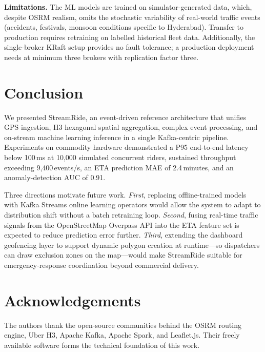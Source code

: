 \documentclass[conference]{IEEEtran}
\begin{document}
\textbf{Limitations.}
The ML models are trained on simulator-generated data, which, despite
OSRM realism, omits the stochastic variability of real-world traffic
events (accidents, festivals, monsoon conditions specific to Hyderabad).
Transfer to production requires retraining on labelled historical
fleet data. Additionally, the single-broker KRaft setup provides no
fault tolerance; a production deployment needs at minimum three brokers
with replication factor three.

\section{Conclusion}
\label{sec:conclusion}

We presented StreamRide, an event-driven reference architecture that
unifies GPS ingestion, H3 hexagonal spatial aggregation, complex event
processing, and on-stream machine learning inference in a single
Kafka-centric pipeline. Experiments on commodity hardware demonstrated
a P95 end-to-end latency below 100\,ms at 10,000 simulated concurrent
riders, sustained throughput exceeding 9,400\,events/s, an ETA
prediction MAE of 2.4\,minutes, and an anomaly-detection AUC of 0.91.

Three directions motivate future work. \textit{First}, replacing
offline-trained models with Kafka Streams online learning operators
would allow the system to adapt to distribution shift without a batch
retraining loop. \textit{Second}, fusing real-time traffic signals
from the OpenStreetMap Overpass API into the ETA feature set is
expected to reduce prediction error further. \textit{Third}, extending
the dashboard geofencing layer to support dynamic polygon creation at
runtime—so dispatchers can draw exclusion zones on the map—would
make StreamRide suitable for emergency-response coordination beyond
commercial delivery.

\section*{Acknowledgements}
The authors thank the open-source communities behind the OSRM routing
engine, Uber H3, Apache Kafka, Apache Spark, and Leaflet.js. Their
freely available software forms the technical foundation of this work.
\end{document}
